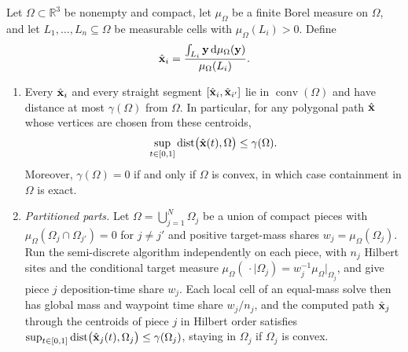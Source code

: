 \begin{proposition}
  \label{prop:sd-hull-gap}
  Let $\Omega\subset\mathbb R^3$ be nonempty and compact, let $\mu_\Omega$ be a finite Borel measure on $\Omega$, and let $L_1,\ldots,L_n\subseteq\Omega$ be measurable cells with $\mu_\Omega(L_i)>0$. Define
  \[
    \hat {\bm{\mathrm{x}}}_i=\frac{\int_{L_i}{\bm{\mathrm{y}}}\,\mathrm{d}\mu_\Omega({\bm{\mathrm{y}}})}{\mu_\Omega(L_i)}.
  \]
  \begin{enumerate}[label=(\roman*)]
    \item Every $\hat {\bm{\mathrm{x}}}_i$ and every straight segment $[\hat {\bm{\mathrm{x}}}_i,\hat {\bm{\mathrm{x}}}_{i'}]$ lie in $\operatorname{conv}(\Omega)$ and have distance at most $\gamma(\Omega)$ from $\Omega$. In particular, for any polygonal path $\hat{\bm{\mathrm{x}}}$ whose vertices are chosen from these centroids,
          \begin{equation}
            \label{eq:vsfc-hull-excursion}
            \sup_{t\in[0,1]}\operatorname{dist}\bigl(\hat{\bm{\mathrm{x}}}(t),\Omega\bigr)\leq\gamma(\Omega).
          \end{equation}
          Moreover, $\gamma(\Omega)=0$ if and only if $\Omega$ is convex, in which case containment in $\Omega$ is exact.
    \item \emph{Partitioned parts.} Let $\Omega=\bigcup_{j=1}^N\Omega_j$ be a union of compact pieces with $\mu_\Omega(\Omega_j\cap\Omega_{j'})=0$ for $j\neq j'$ and positive target-mass shares $w_j=\mu_\Omega(\Omega_j)$. Run the semi-discrete algorithm independently on each piece, with $n_j$ Hilbert sites and the conditional target measure $\mu_\Omega(\,\cdot\mid\Omega_j)=w_j^{-1}\mu_\Omega|_{\Omega_j}$, and give piece $j$ deposition-time share $w_j$. Each local cell of an equal-mass solve then has global mass and waypoint time share $w_j/n_j$, and the computed path $\hat{\bm{\mathrm{x}}}_j$ through the centroids of piece $j$ in Hilbert order satisfies $\sup_{t\in[0,1]}\operatorname{dist}\bigl(\hat{\bm{\mathrm{x}}}_j(t),\Omega_j\bigr)\leq\gamma(\Omega_j)$, staying in $\Omega_j$ if $\Omega_j$ is convex.
  \end{enumerate}
\end{proposition}
